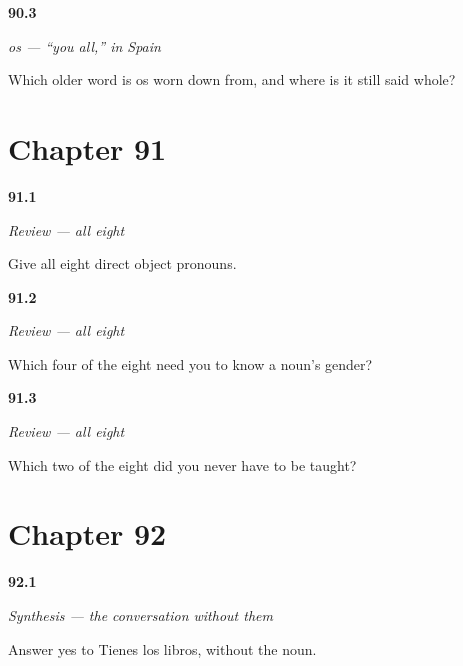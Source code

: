 \noindent\begin{minipage}[t]{\linewidth}
\raggedright
\hypertarget{review-ES-C45-os-vos}{\textbf{90.3}} \emph{os — \textquotedblleft{}you all,\textquotedblright{} in Spain}\par
\small Which older word is os worn down from, and where is it still said whole?
\end{minipage}\par\medskip

\section*{Chapter 91}

\noindent\begin{minipage}[t]{\linewidth}
\raggedright
\hypertarget{review-ES-C45-repaso-ocho-all}{\textbf{91.1}} \emph{Review — all eight}\par
\small Give all eight direct object pronouns.
\end{minipage}\par\medskip

\noindent\begin{minipage}[t]{\linewidth}
\raggedright
\hypertarget{review-ES-C45-repaso-ocho-quarter}{\textbf{91.2}} \emph{Review — all eight}\par
\small Which four of the eight need you to know a noun's gender?
\end{minipage}\par\medskip

\noindent\begin{minipage}[t]{\linewidth}
\raggedright
\hypertarget{review-ES-C45-repaso-ocho-free}{\textbf{91.3}} \emph{Review — all eight}\par
\small Which two of the eight did you never have to be taught?
\end{minipage}\par\medskip

\section*{Chapter 92}

\noindent\begin{minipage}[t]{\linewidth}
\raggedright
\hypertarget{review-ES-C45-sintesis-sin-repetir-books}{\textbf{92.1}} \emph{Synthesis — the conversation without them}\par
\small Answer yes to Tienes los libros, without the noun.
\end{minipage}\par\medskip

